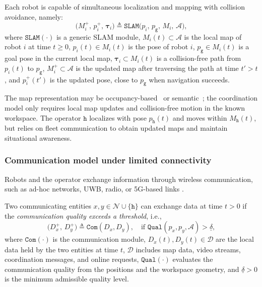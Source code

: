 \begin{definition}
Each robot is capable of simultaneous localization and mapping with collision
avoidance, namely:
\begin{equation}
\bigl(M_i^+,\, p_i^+,\, \boldsymbol{\tau}_i\bigr) \triangleq
\texttt{SLAM}\bigl(p_i,\, p_{\texttt{g}},\, M_i,\, \mathcal{A}\bigr),
\label{ch05:eq:slam}
\end{equation}
where $\texttt{SLAM}(\cdot)$ is a generic SLAM module, $M_i(t) \subset
\mathcal{A}$ is the local map of robot $i$ at time $t \geq 0$,
$p_i(t) \in M_i(t)$ is the pose of robot $i$, $p_{\texttt{g}} \in M_i(t)$ is a
goal pose in the current local map, $\boldsymbol{\tau}_i \subset M_i(t)$ is a
collision-free path from $p_i(t)$ to $p_{\texttt{g}}$, $M_i^+ \subset
\mathcal{A}$ is the updated map after traversing the path at time $t' > t$, and
$p_i^+(t')$ is the updated pose, close to $p_{\texttt{g}}$ when navigation
succeeds.
\end{definition}

The map representation may be occupancy-based~\citep{thrun2002probabilistic} or
semantic~\citep{tian2022kimera}; the coordination model only requires local map
updates and collision-free motion in the known workspace. The operator
$\texttt{h}$ localizes with pose $p_{\texttt{h}}(t)$ and moves within
$M_{\texttt{h}}(t)$, but relies on fleet communication to obtain updated maps
and maintain situational awareness.

\subsubsection{Communication model under limited connectivity}
\label{ch05:subsec:com}

Robots and the operator exchange information through wireless communication,
such as ad-hoc networks, UWB, radio, or 5G-based links
\citep{klaesson2020planning,xia2023relink}.

\begin{definition}
Two communicating entities $x, y \in \mathcal{N} \cup \{\texttt{h}\}$ can
exchange data at time $t > 0$ if the \emph{communication quality exceeds a threshold}, i.e.,
\begin{equation}
\bigl(D_x^+,\, D_y^+\bigr) \triangleq \texttt{Com}(D_x, D_y),
\quad \text{if } \texttt{Qual}(p_x, p_y, \mathcal{A}) > \underline{\delta},
\label{ch05:eq:com}
\end{equation}
where $\texttt{Com}(\cdot)$ is the communication module, $D_x(t), D_y(t) \in
\mathcal{D}$ are the local data held by the two entities at time $t$,
$\mathcal{D}$ includes map data, video streams, coordination messages, and
online requests, $\texttt{Qual}(\cdot)$ evaluates the communication quality
from the positions and the workspace geometry, and $\underline{\delta} > 0$ is
the minimum admissible quality level.
\end{definition}

